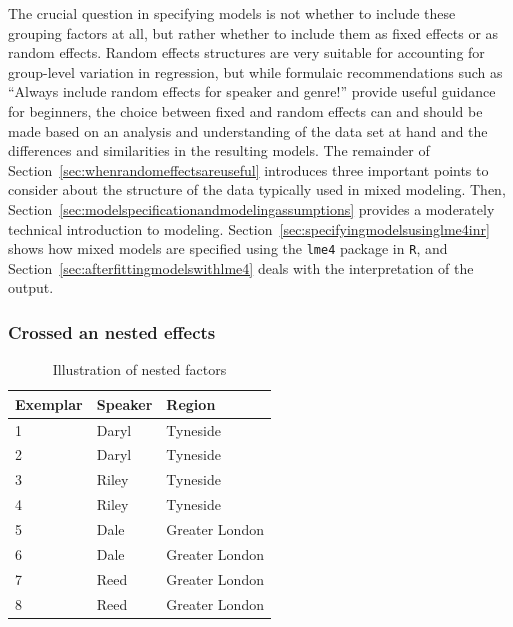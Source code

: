 \documentclass[a4paper,12pt]{article}
\begin{document}
The crucial question in specifying models is not whether to include these grouping factors at all, but rather whether to include them as fixed effects or as random effects.
Random effects structures are very suitable for accounting for group-level variation in regression, but while formulaic recommendations such as ``Always include random effects for speaker and genre!'' provide useful guidance for beginners, the choice between fixed and random effects can and should be made based on an analysis and understanding of the data set at hand and the differences and similarities in the resulting models.
The remainder of Section~\ref{sec:whenrandomeffectsareuseful} introduces three important points to consider about the structure of the data typically used in mixed modeling.
Then, Section~\ref{sec:modelspecificationandmodelingassumptions} provides a moderately technical introduction to modeling.
Section~\ref{sec:specifyingmodelsusinglme4inr} shows how mixed models are specified using the \texttt{lme4} package in \texttt{R}, and Section~\ref{sec:afterfittingmodelswithlme4} deals with the interpretation of the output.


\subsubsection{Crossed an nested effects}
\label{sec:crossedandnestedeffects}

\begin{table}
  \centering
  \begin{tabular}{lll}
    \toprule
    \textbf{Exemplar} & \textbf{Speaker}  & \textbf{Region}        \\
    \midrule
                    1 &           Daryl  &         Tyneside       \\
                    2 &           Daryl  &         Tyneside       \\
                    3 &           Riley  &         Tyneside       \\
                    4 &           Riley  &         Tyneside       \\
                    5 &           Dale   &         Greater London \\
                    6 &           Dale   &         Greater London \\
                    7 &           Reed   &         Greater London \\
                    8 &           Reed   &         Greater London \\
    \bottomrule
  \end{tabular}
  \caption{Illustration of nested factors}
  \label{tab:nested}
\end{table}
\end{document}
